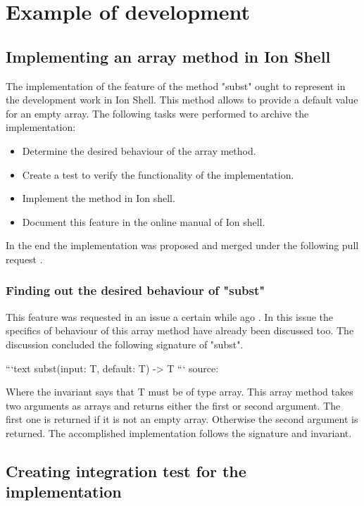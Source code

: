 \section{Example of development}

\subsection{Implementing an array method in Ion Shell}

The implementation of the feature of the method "subst" ought to represent in the development work in Ion Shell.
This method allows to provide a default value for an empty array.
The following tasks were performed to archive the implementation:

\begin{itemize}
	\item Determine the desired behaviour of the array method.
	\item Create a test to verify the functionality of the implementation.
	\item Implement the method in Ion shell.
	\item Document this feature in the online manual of Ion shell.
\end{itemize}

In the end the implementation was proposed and merged under the following pull request \cite{pr_subst_method}.

\subsubsection{Finding out the desired behaviour of "subst"}

This feature was requested in an issue a certain while ago \cite{ion_shell_subst_issue}.
In this issue the specifics of behaviour of this array method have already been discussed too.
The discussion concluded the following signature of "subst".

```text
subst(input: T, default: T) -> T
```
source: \cite{issue_subst_request}

Where the invariant says that T must be of type array.
This array method takes two arguments as arrays and returns either the first or second argument.
The first one is returned if it is not an empty array. Otherwise the second argument is returned.
The accomplished implementation follows the signature and invariant.

\subsection{Creating integration test for the implementation}\label{subst_test}

